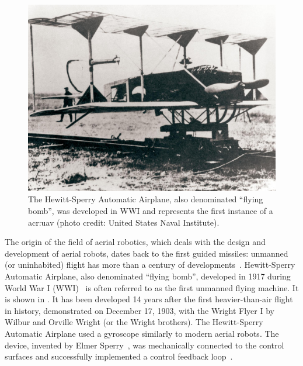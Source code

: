 \begin{figure}[t]
  \centering
  \includegraphics[width=.7\textwidth]{pictures/HA-NH-JA-19_1}
  \caption[Hewitt-Sperry Automatic Airplane, first unmanned flying machine]{The Hewitt-Sperry Automatic Airplane, also denominated ``flying bomb'', was developed in WWI and represents the first instance of a \Gls{acr:uav} {\scriptsize(photo credit: United States Naval Institute)}.}   
  \label{fig:hewitt-sperry}
\end{figure}

The origin of the field of aerial robotics, which deals with the design and development of aerial robots, dates back to the first guided missiles: unmanned (or uninhabited) flight has more than a century of developments~\citep{siciliano2016springer}. Hewitt-Sperry Automatic Airplane, also denominated ``flying bomb'', developed in 1917 during World War I (WWI)~\citep{keane2013brief,valavanis2015handbook} is often referred to as the first unmanned flying machine. It is shown in . It has been developed 14 years after the first heavier-than-air flight in history, demonstrated on December 17, 1903, with the Wright Flyer I by Wilbur and Orville Wright (or the Wright brothers). The Hewitt-Sperry Automatic Airplane used a gyroscope similarly to modern aerial robots. The device, invented by Elmer Sperry~\citep{keane2013brief}, was mechanically connected to the control surfaces and successfully implemented a control feedback loop~\citep{siciliano2016springer}.

